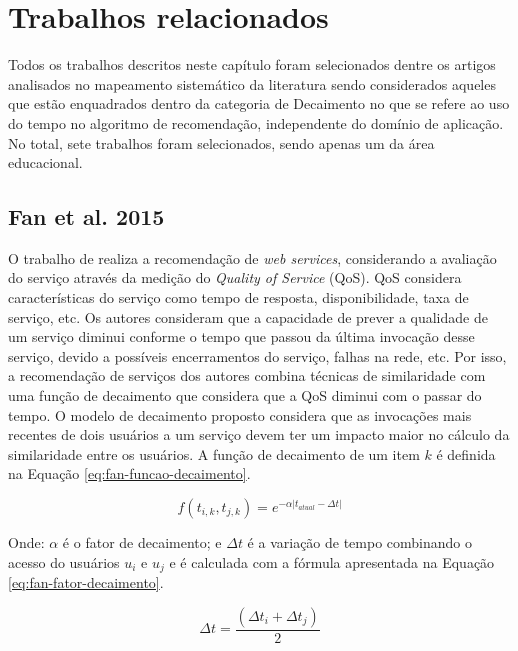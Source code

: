 \chapter{Trabalhos relacionados}\label{chapter:trabalhos-relacionados}

Todos os trabalhos descritos neste capítulo foram selecionados dentre os artigos analisados no mapeamento sistemático
da literatura \cite{de2017time} sendo considerados aqueles que estão enquadrados dentro da categoria de Decaimento no que
se refere ao uso do tempo no algoritmo de recomendação, independente do domínio de aplicação. No total, sete trabalhos
foram selecionados, sendo apenas um da área educacional.

\section{Fan et al. 2015}

O trabalho de  realiza a recomendação de \textit{web services}, considerando a avaliação do serviço
através da medição do \textit{Quality of Service} (QoS). QoS considera características do serviço como tempo de resposta,
disponibilidade, taxa de serviço, etc. Os autores consideram que a capacidade de prever a qualidade de um serviço diminui
conforme o tempo que passou da última invocação desse serviço, devido a possíveis encerramentos do serviço, falhas na
rede, etc. Por isso, a recomendação de serviços dos autores combina técnicas de similaridade com uma função de
decaimento que considera que a QoS diminui com o passar do tempo. O modelo de decaimento proposto considera que as
invocações mais recentes de dois usuários a um serviço devem ter um impacto maior no cálculo da similaridade entre os
usuários. A função de decaimento de um item $k$ é definida na Equação \ref{eq:fan-funcao-decaimento}.

\begin{equation}
  \label{eq:fan-funcao-decaimento}
  f(t_{i,k}, t_{j,k}) = e^{-\alpha \left|t_{atual} - \Delta t \right|}
\end{equation}

Onde: $\alpha$ é o fator de decaimento; e $\Delta t$ é a variação de tempo combinando o acesso do usuários $u_i$ e $u_j$
e é calculada com a fórmula apresentada na Equação \ref{eq:fan-fator-decaimento}.

\begin{equation}
  \label{eq:fan-fator-decaimento}
  \Delta t = \frac{(\Delta t_i + \Delta t_j)}{2}
\end{equation}

